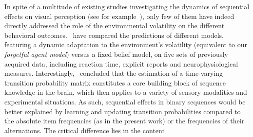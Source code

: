 \documentclass[12pt,english]{article}%
\newcommand{\citep}[1]{\parencite{#1}}
\newcommand{\citet}[1]{\textcite{#1}}
\begin{document}
In spite of a multitude of existing studies investigating the dynamics of sequential effects on visual perception (see for example~\citet{Cicchini_PRSB_2018,ChopinMamassian2012}), only few of them have indeed directly addressed the role of the environmental volatility on the different behavioral outcomes.~\citet{Meyniel16} have compared the predictions of different models, featuring a dynamic adaptation to the environment's volatility (equivalent to our \textit{forgetful agent model}) versus a fixed belief model, on five sets of previously acquired data, including reaction time, explicit reports and neurophysiological measures. Interestingly,~\citet{Meyniel16} concluded that the estimation of a time-varying transition probability matrix constitutes
a core building block of sequence knowledge in the brain,
which then applies to a variety of sensory modalities and
experimental situations.
As such, sequential effects in binary sequences would be better explained
by learning and updating transition probabilities
compared to the absolute item frequencies (as in the present work) or the frequencies of their alternations.
The critical difference lies in the content
\end{document}
